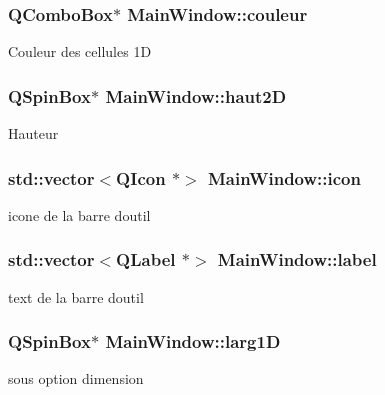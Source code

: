 \subsubsection[{\texorpdfstring{couleur}{couleur}}]{\setlength{\rightskip}{0pt plus 5cm}Q\+Combo\+Box$\ast$ Main\+Window\+::couleur\hspace{0.3cm}{\ttfamily [private]}}\hypertarget{class_main_window_aae0246fdb4536b62a90c2fd39fef98ab}{}\label{class_main_window_aae0246fdb4536b62a90c2fd39fef98ab}
Couleur des cellules 1D 
\subsubsection[{\texorpdfstring{haut2D}{haut2D}}]{\setlength{\rightskip}{0pt plus 5cm}Q\+Spin\+Box$\ast$ Main\+Window\+::haut2D\hspace{0.3cm}{\ttfamily [private]}}\hypertarget{class_main_window_aea127325b7c01f02b7a98b17595326bb}{}\label{class_main_window_aea127325b7c01f02b7a98b17595326bb}
Hauteur 
\subsubsection[{\texorpdfstring{icon}{icon}}]{\setlength{\rightskip}{0pt plus 5cm}std\+::vector$<$Q\+Icon $\ast$$>$ Main\+Window\+::icon\hspace{0.3cm}{\ttfamily [private]}}\hypertarget{class_main_window_ab903c7e6c6310d5ae1455d5935ec446a}{}\label{class_main_window_ab903c7e6c6310d5ae1455d5935ec446a}
icone de la barre d\textquotesingle{}outil 
\subsubsection[{\texorpdfstring{label}{label}}]{\setlength{\rightskip}{0pt plus 5cm}std\+::vector$<$Q\+Label $\ast$$>$ Main\+Window\+::label\hspace{0.3cm}{\ttfamily [private]}}\hypertarget{class_main_window_a4d2abb2a3dc6e601f8ed99ec58879f79}{}\label{class_main_window_a4d2abb2a3dc6e601f8ed99ec58879f79}
text de la barre d\textquotesingle{}outil 
\subsubsection[{\texorpdfstring{larg1D}{larg1D}}]{\setlength{\rightskip}{0pt plus 5cm}Q\+Spin\+Box$\ast$ Main\+Window\+::larg1D\hspace{0.3cm}{\ttfamily [private]}}\hypertarget{class_main_window_a8ea57e6e7e57cbe0e03ebb75a385439a}{}\label{class_main_window_a8ea57e6e7e57cbe0e03ebb75a385439a}
sous option dimension 
